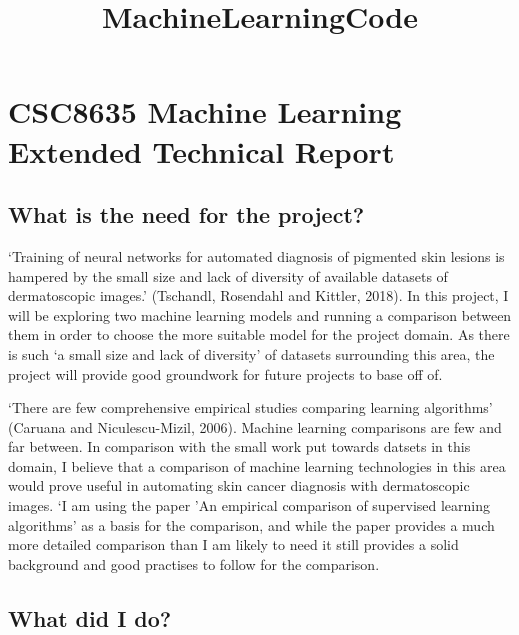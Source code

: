 \documentclass[11pt]{article}
\title{MachineLearningCode}
\begin{document}
    
    
    \maketitle
    
    

    
    \hypertarget{csc8635-machine-learning-extended-technical-report}{%
\section{CSC8635 Machine Learning Extended Technical
Report}\label{csc8635-machine-learning-extended-technical-report}}

\hypertarget{what-is-the-need-for-the-project}{%
\subsection{What is the need for the
project?}\label{what-is-the-need-for-the-project}}

`Training of neural networks for automated diagnosis of pigmented skin
lesions is hampered by the small size and lack of diversity of available
datasets of dermatoscopic images.' (Tschandl, Rosendahl and Kittler,
2018). In this project, I will be exploring two machine learning models
and running a comparison between them in order to choose the more
suitable model for the project domain. As there is such `a small size
and lack of diversity' of datasets surrounding this area, the project
will provide good groundwork for future projects to base off of.

`There are few comprehensive empirical studies comparing learning
algorithms' (Caruana and Niculescu-Mizil, 2006). Machine learning
comparisons are few and far between. In comparison with the small work
put towards datsets in this domain, I believe that a comparison of
machine learning technologies in this area would prove useful in
automating skin cancer diagnosis with dermatoscopic images. `I am using
the paper 'An empirical comparison of supervised learning algorithms' as
a basis for the comparison, and while the paper provides a much more
detailed comparison than I am likely to need it still provides a solid
background and good practises to follow for the comparison.

    \hypertarget{what-did-i-do}{%
\subsection{What did I do?}\label{what-did-i-do}}
\end{document}
